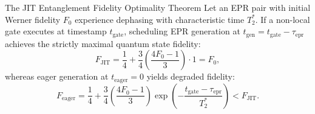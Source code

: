 \begin{theorembox}{The JIT Entanglement Fidelity Optimality Theorem}
Let an EPR pair with initial Werner fidelity $F_0$ experience dephasing with characteristic time $T_2^*$. If a non-local gate executes at timestamp $t_{\text{gate}}$, scheduling EPR generation at $t_{\text{gen}} = t_{\text{gate}} - \tau_{\text{epr}}$ achieves the strictly maximal quantum state fidelity:
\begin{equation}
    F_{\text{JIT}} = \frac{1}{4} + \frac{3}{4} \left( \frac{4F_0 - 1}{3} \right) \cdot 1 = F_0,
\end{equation}
whereas eager generation at $t_{\text{eager}} = 0$ yields degraded fidelity:
\begin{equation}
    F_{\text{eager}} = \frac{1}{4} + \frac{3}{4} \left( \frac{4F_0 - 1}{3} \right) \exp\left( - \frac{t_{\text{gate}} - \tau_{\text{epr}}}{T_2^*} \right) < F_{\text{JIT}}.
\end{equation}
\end{theorembox}

